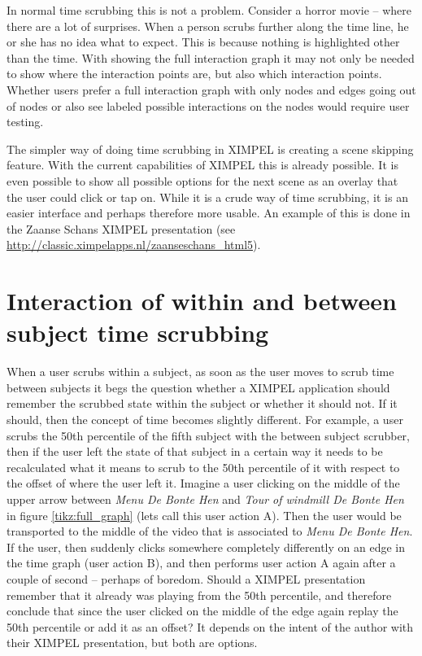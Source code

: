 In normal time scrubbing this is not a problem. Consider a horror movie -- where there are a lot of surprises. When a person scrubs further along the time line, he or she has no idea what to expect. This is because nothing is highlighted other than the time. With showing the full interaction graph it may not only be needed to show where the interaction points are, but also which interaction points. Whether users prefer a full interaction graph with only nodes and edges going out of nodes or also see labeled possible interactions on the nodes would require user testing. 

The simpler way of doing time scrubbing in XIMPEL is creating a scene skipping feature. With the current capabilities of XIMPEL this is already possible. It is even possible to show all possible options for the next scene as an overlay that the user could click or tap on. While it is a crude way of time scrubbing, it is an easier interface and perhaps therefore more usable. An example of this is done in the Zaanse Schans XIMPEL presentation (see \url{http://classic.ximpelapps.nl/zaanseschans_html5}).

\section{Interaction of within and between subject time scrubbing}
When a user scrubs within a subject, as soon as the user moves to scrub time between subjects it begs the question whether a XIMPEL application should remember the scrubbed state within the subject or whether it should not. If it should, then the concept of time becomes slightly different. For example, a user scrubs the 50th percentile of the fifth subject with the between subject scrubber, then if the user left the state of that subject in a certain way it needs to be recalculated what it means to scrub to the 50th percentile of it with respect to the offset of where the user left it. Imagine a user clicking on the middle of the upper arrow between \textit{Menu De Bonte Hen} and \textit{Tour of windmill De Bonte Hen} in figure \ref{tikz:full_graph} (lets call this user action A). Then the user would be transported to the middle of the video that is associated to \textit{Menu De Bonte Hen}. If the user, then suddenly clicks somewhere completely differently on an edge in the time graph (user action B), and then performs user action A again after a couple of second -- perhaps of boredom. Should a XIMPEL presentation remember that it already was playing from the 50th percentile, and therefore conclude that since the user clicked on the middle of the edge again replay the 50th percentile or add it as an offset? It depends on the intent of the author with their XIMPEL presentation, but both are options.


